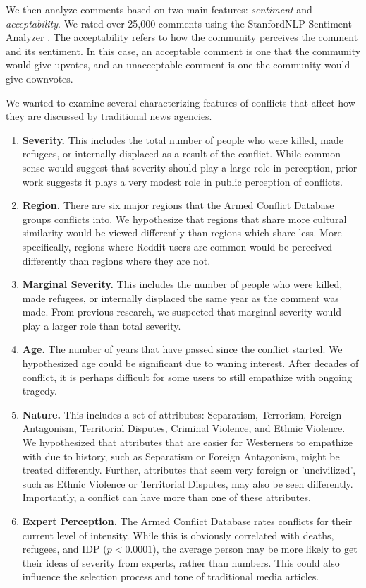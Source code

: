 We then analyze comments based on two main features: \textit{sentiment} and \textit{acceptability}. We rated over 25,000 comments using the StanfordNLP Sentiment Analyzer \cite{stanfordnlp}. The acceptability refers to how the community perceives the comment and its sentiment. In this case, an acceptable comment is one that the community would give upvotes, and an unacceptable comment is one the community would give downvotes.

We wanted to examine several characterizing features of conflicts that affect how they are discussed by traditional news agencies.

\begin{enumerate}
\item{\textbf{Severity.} This includes the total number of people who were killed, made refugees, or internally displaced as a result of the conflict. While common sense would suggest that severity should play a large role in perception, prior work suggests it plays a very modest role in public perception of conflicts.} 
\item {\textbf{Region.} There are six major regions that the Armed Conflict Database groups conflicts into. We hypothesize that regions that share more cultural similarity would be viewed differently than regions which share less. More specifically, regions where Reddit users are common would be perceived differently than regions where they are not.} 
\item {\textbf{Marginal Severity.} This includes the number of people who were killed, made refugees, or internally displaced the same year as the comment was made. From previous research, we suspected that marginal severity would play a larger role than total severity.}
\item {\textbf{Age.} The number of years that have passed since the conflict started. We hypothesized age could be significant due to waning interest. After decades of conflict, it is perhaps difficult for some users to still empathize with ongoing tragedy.}
\item {\textbf{Nature.} This includes a set of attributes: Separatism, Terrorism, Foreign Antagonism, Territorial Disputes, Criminal Violence, and Ethnic Violence. We hypothesized that attributes that are easier for Westerners to empathize with due to history, such as Separatism or Foreign Antagonism, might be treated differently. Further, attributes that seem very foreign or 'uncivilized', such as Ethnic Violence or Territorial Disputes, may also be seen differently. Importantly, a conflict can have more than one of these attributes.}
\item {\textbf{Expert Perception.} The Armed Conflict Database rates conflicts for their current level of intensity. While this is obviously correlated with deaths, refugees, and IDP ($p < 0.0001$), the average person may be more likely to get their ideas of severity from experts, rather than numbers. This could also influence the selection process and tone of traditional media articles.} 
\end{enumerate}